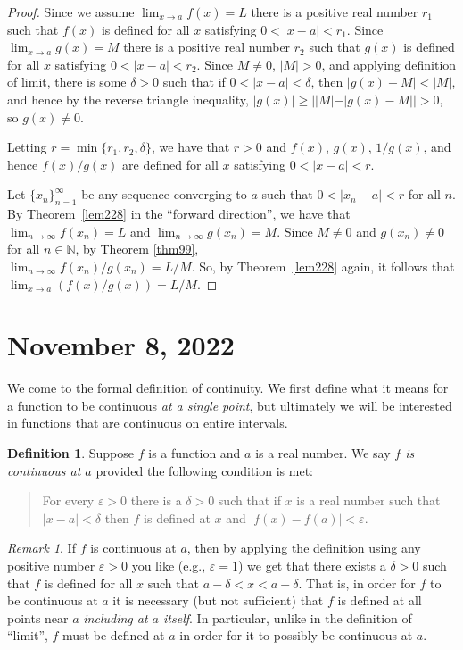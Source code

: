 \documentclass[12pt]{amsart}
\def\d{\delta}
\def\e{\varepsilon}
\newcommand{\N}{\mathbb{N}}
\numberwithin{equation}{section}
\theoremstyle{plain} %
\newcommand{\Nov}[1]{\section{November #1, 2022}}
\theoremstyle{definition}
\newtheorem{defn}[equation]{Definition}
\theoremstyle{remark}
\newtheorem{rem}[equation]{Remark}
\begin{document}
\begin{enumerate}
\begin{framed}
\begin{proof}
Since we assume
	${\lim_{x \to a} f(x) = L}$ there is a positive real number $r_1$ such that $f(x)$ is defined for all $x$ satisfying $0 < |x-a| < r_1$.
Since
	$\lim_{x \to a} g(x) = M$ there is a positive real number $r_2$ such that $g(x)$ is defined for all $x$ satisfying $0 < |x-a| < r_2$. Since $M\neq 0$, $|M|>0$, and applying definition of limit, there is some $\delta>0$ such that if $0<|x-a| < \delta$, then $|g(x)-M|<|M|$, and hence by the reverse triangle inequality, $|g(x)| \geq | |M| - |g(x)-M| | >0$, so $g(x)\neq 0$. 
	
	Letting $r = \min\{r_1, r_2,\delta\}$,
	we have that $r > 0$ and $f(x)$, $g(x)$, $1/g(x)$, and hence $f(x)/g(x)$ are defined for all $x$ satisfying $0 < |x-a| < r$. 	
	
	Let $\{x_n\}_{n=1}^\infty$ be any sequence converging to $a$ such that  ${0 < |x_n -a| < r}$ for all $n$. 
	By  Theorem~\ref{lem228} in the ``forward direction'', we have that  $\lim_{n \to \infty} f(x_n) = L$ and $\lim_{n \to \infty} g(x_n) = M$. Since $M\neq 0$ and $g(x_n)\neq 0$ for all $n\in \N$, by Theorem \ref{thm99}, \\
	${\lim_{n \to \infty} f(x_n) /g(x_n) = L / M}$. 
	So, by  Theorem~\ref{lem228} again, it follows that
	$\lim_{x \to a} (f(x) / g(x)) = L / M$.
\end{proof}
\end{framed}
\end{enumerate}


\Nov{8}

We come to the formal definition of continuity. We first define what it means for a function to be continuous {\em at a single point}, but ultimately we will be
interested in functions that are continuous on entire intervals.

\begin{defn} Suppose $f$ is a function and $a$ is a real number.
  We say {\em $f$ is
    continuous at $a$} provided the following condition is met:
\begin{quote}
For every $\e > 0$ there is a $\d > 0$ such that if $x$ is a real
number such that $|x - a| < \d$ then $f$ is defined at $x$ and $|f(x) - f(a)| < \e$.
\end{quote}
\end{defn}

\begin{rem} If $f$ is continuous at $a$, then by applying the definition using any positive number $\e > 0$ you like (e.g., $\e = 1$) we get that  
there exists a $\d> 0$ such that $f$ is defined for all $x$ such that $a-\d < x < a+\d$. That is, in order for $f$ to be continuous at $a$ it is necessary (but not sufficient) that $f$ is defined at all points near $a$ {\em including at $a$ itself}.
In particular, unlike in the
  definition of ``limit'', $f$ must be defined at $a$ in order for it to possibly be continuous at $a$.
\end{rem}
\end{document}
